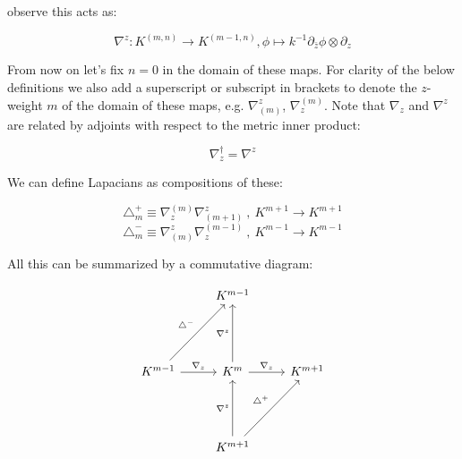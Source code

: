     observe this acts as:

    \begin{equation}
        \nabla^z: K^{(m, n)} \to K^{(m - 1, n)}, \phi \mapsto k^{-1}\partial_{\bar z} \phi \otimes \partial_{ z}
    \end{equation}

    From now on let's fix $n=0$ in the domain of these maps. For clarity of the below definitions we also add a superscript or subscript in brackets to denote the $z$-weight $m$ of the domain of these maps, e.g. $\nabla^z_{(m)}$, $\nabla_z^{(m)}$. Note that $\nabla_z$ and $\nabla^z$ are related by adjoints with respect to the metric inner product:

    \begin{equation}
        \nabla_z^\dagger = \nabla^z
    \end{equation}

    We can define Lapacians as compositions of these:

    \begin{equation}
        \triangle^+_m \equiv \nabla_z^{(m)} \nabla^z_{(m+1)} ~,~ K^{m+1} \to K^{m + 1}
    \end{equation}
    \begin{equation}
        \triangle^-_m \equiv \nabla^z_{(m)} \nabla_z^{(m-1)} ~,~ K^{m-1} \to K^{m - 1}
    \end{equation}

    All this can be summarized by a commutative diagram:

    \begin{equation}
        \begin{tikzcd}[row sep=4.5em]
            & K^{m-1} \\
            K^{m-1} \arrow{r}{\nabla_z}
            \arrow{ru}{\triangle^-} & K^m \arrow{u}{\nabla^z}
            \arrow{r}{\nabla_z} & K^{m+1}\\
            &K^{m+1} \arrow{ru}{\triangle^+} \arrow{u}{\nabla^z}
        \end{tikzcd}
    \end{equation}
